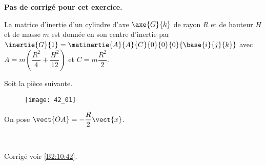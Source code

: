 \normaltrue \difficilefalse \tdifficilefalse
\correctionfalse


\setcounter{numques}{0}
\ifcorrection
\else
\textbf{Pas de corrigé pour cet exercice.}
\fi

\ifprof
\else

La matrice d'inertie d'un cylindre d'axe $\axe{G}{k}$ de rayon $R$ et de hauteur $H$ et de masse $m$ est donnée en son centre d'inertie par 
$\inertie{G}{1}=\matinertie{A}{A}{C}{0}{0}{0}{\base{i}{j}{k}}$ avec $A=m\left(\dfrac{R^2}{4}+\dfrac{H^2}{12} \right)$ et $C=m\dfrac{R^2}{2}$. 


Soit la pièce suivante. 
\begin{figure}[H]
\centering
\texttt{[image: 42\_01]}
\end{figure}

On pose $\vect{OA}=-\dfrac{R}{2}\vect{x}$.

\fi


\ifprof
\else
\fi

\ifprof ~\\
\else
\fi


\ifprof
\else
\begin{flushright}
\footnotesize{Corrigé voir \ref{B2:10:42}.}
\end{flushright}%
\fi